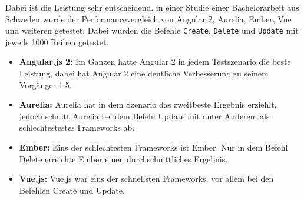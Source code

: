 Dabei ist die Leistung sehr entscheidend. \newline
in einer Studie einer Bachelorarbeit aus Schweden wurde der Performancevergleich von Angular 2, Aurelia,  Ember, Vue und weiteren getestet. Dabei wurden die Befehle \texttt{Create}, \texttt{Delete} und \texttt{Update} mit jeweils 1000 Reihen getestet.\cite{Svensson2015}
\begin{itemize}
\item \textbf{Angular.js 2:} Im Ganzen hatte Angular 2 in jedem Testszenario die beste Leistung, dabei hat Angular 2 eine deutliche Verbesserung zu seinem Vorg\"anger 1.5\cite{Svensson2015}.
\item \textbf{Aurelia:} Aurelia hat in dem Szenario das zweitbeste Ergebnis erziehlt, jedoch schnitt Aurelia bei dem Befehl Update mit unter Anderem als schlechtestestes Frameworks ab\cite{Svensson2015}.
\item \textbf{Ember:} Eins der schlechtesten Frameworks ist Ember. Nur in dem Befehl Delete erreichte Ember einen durchschnittliches Ergebnis\cite{Svensson2015}.
\item \textbf{Vue.js:} Vue.js war eins der schnellsten Frameworks, vor allem bei den Befehlen Create und Update\cite{Svensson2015}.
\end{itemize}

